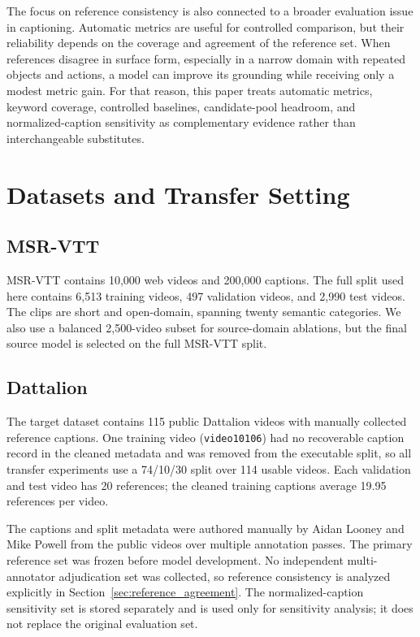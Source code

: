 \documentclass[pdflatex,sn-mathphys-num]{sn-jnl}
\theoremstyle{thmstyleone}
\theoremstyle{thmstyletwo}
\theoremstyle{thmstylethree}
\begin{document}
The focus on reference consistency is also connected to a broader evaluation issue in captioning. Automatic metrics are useful for controlled comparison, but their reliability depends on the coverage and agreement of the reference set. When references disagree in surface form, especially in a narrow domain with repeated objects and actions, a model can improve its grounding while receiving only a modest metric gain. For that reason, this paper treats automatic metrics, keyword coverage, controlled baselines, candidate-pool headroom, and normalized-caption sensitivity as complementary evidence rather than interchangeable substitutes.

\section{Datasets and Transfer Setting}\label{sec3}
\subsection{MSR-VTT}
MSR-VTT \cite{MSR-VTTdataset} contains 10,000 web videos and 200,000 captions. The full split used here contains 6,513 training videos, 497 validation videos, and 2,990 test videos. The clips are short and open-domain, spanning twenty semantic categories. We also use a balanced 2,500-video subset for source-domain ablations, but the final source model is selected on the full MSR-VTT split.

\subsection{Dattalion}
The target dataset contains 115 public Dattalion videos with manually collected reference captions. One training video (\texttt{video10106}) had no recoverable caption record in the cleaned metadata and was removed from the executable split, so all transfer experiments use a 74/10/30 split over 114 usable videos. Each validation and test video has 20 references; the cleaned training captions average 19.95 references per video.

The captions and split metadata were authored manually by Aidan Looney and Mike Powell from the public videos over multiple annotation passes. The primary reference set was frozen before model development. No independent multi-annotator adjudication set was collected, so reference consistency is analyzed explicitly in Section~\ref{sec:reference_agreement}. The normalized-caption sensitivity set is stored separately and is used only for sensitivity analysis; it does not replace the original evaluation set.
\end{document}
